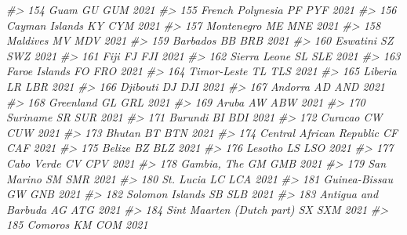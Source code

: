 \documentclass[
  xelatex, ja=standard]{bxjsbook}
\newenvironment{Shaded}{\begin{snugshade}}{\end{snugshade}}
\newcommand{\CommentTok}[1]{\textcolor[rgb]{0.56,0.35,0.01}{\textit{#1}}}
\theoremstyle{definition}
\theoremstyle{definition}
\theoremstyle{definition}
\theoremstyle{definition}
\theoremstyle{remark}
\begin{document}
\begin{Shaded}
\begin{Highlighting}[]
\CommentTok{\#\textgreater{} 154                           Guam    GU   GUM 2021}
\CommentTok{\#\textgreater{} 155               French Polynesia    PF   PYF 2021}
\CommentTok{\#\textgreater{} 156                 Cayman Islands    KY   CYM 2021}
\CommentTok{\#\textgreater{} 157                     Montenegro    ME   MNE 2021}
\CommentTok{\#\textgreater{} 158                       Maldives    MV   MDV 2021}
\CommentTok{\#\textgreater{} 159                       Barbados    BB   BRB 2021}
\CommentTok{\#\textgreater{} 160                       Eswatini    SZ   SWZ 2021}
\CommentTok{\#\textgreater{} 161                           Fiji    FJ   FJI 2021}
\CommentTok{\#\textgreater{} 162                   Sierra Leone    SL   SLE 2021}
\CommentTok{\#\textgreater{} 163                  Faroe Islands    FO   FRO 2021}
\CommentTok{\#\textgreater{} 164                    Timor{-}Leste    TL   TLS 2021}
\CommentTok{\#\textgreater{} 165                        Liberia    LR   LBR 2021}
\CommentTok{\#\textgreater{} 166                       Djibouti    DJ   DJI 2021}
\CommentTok{\#\textgreater{} 167                        Andorra    AD   AND 2021}
\CommentTok{\#\textgreater{} 168                      Greenland    GL   GRL 2021}
\CommentTok{\#\textgreater{} 169                          Aruba    AW   ABW 2021}
\CommentTok{\#\textgreater{} 170                       Suriname    SR   SUR 2021}
\CommentTok{\#\textgreater{} 171                        Burundi    BI   BDI 2021}
\CommentTok{\#\textgreater{} 172                        Curacao    CW   CUW 2021}
\CommentTok{\#\textgreater{} 173                         Bhutan    BT   BTN 2021}
\CommentTok{\#\textgreater{} 174       Central African Republic    CF   CAF 2021}
\CommentTok{\#\textgreater{} 175                         Belize    BZ   BLZ 2021}
\CommentTok{\#\textgreater{} 176                        Lesotho    LS   LSO 2021}
\CommentTok{\#\textgreater{} 177                     Cabo Verde    CV   CPV 2021}
\CommentTok{\#\textgreater{} 178                    Gambia, The    GM   GMB 2021}
\CommentTok{\#\textgreater{} 179                     San Marino    SM   SMR 2021}
\CommentTok{\#\textgreater{} 180                      St. Lucia    LC   LCA 2021}
\CommentTok{\#\textgreater{} 181                  Guinea{-}Bissau    GW   GNB 2021}
\CommentTok{\#\textgreater{} 182                Solomon Islands    SB   SLB 2021}
\CommentTok{\#\textgreater{} 183            Antigua and Barbuda    AG   ATG 2021}
\CommentTok{\#\textgreater{} 184      Sint Maarten (Dutch part)    SX   SXM 2021}
\CommentTok{\#\textgreater{} 185                        Comoros    KM   COM 2021}

\end{Highlighting}
\end{Shaded}
\end{document}
